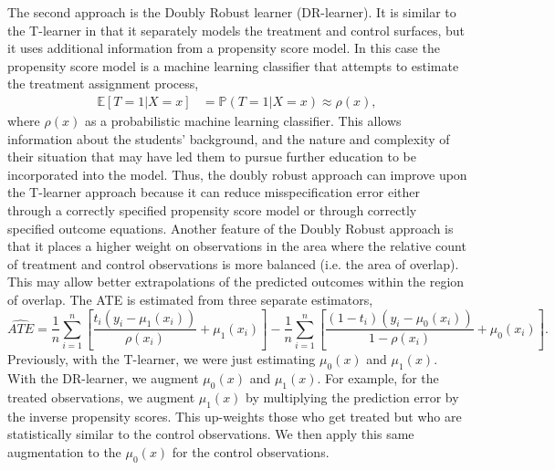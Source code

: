 \documentclass[12pt, a4paper]{article}
\begin{document}
The second approach is the Doubly Robust learner (DR-learner). It is similar to
the T-learner in that it separately models the treatment and control surfaces,
but it uses additional information from a propensity score model. In this case
the propensity score model is a machine learning classifier that attempts
to estimate the treatment assignment process,
\begin{align}
  \mathbb{E}[T=1|X=x] &= \mathbb{P}(T=1|X=x) \approx \rho(x),
\end{align}
where $\rho(x)$ as a probabilistic machine learning classifier. This allows
information about the students' background, and the nature and complexity of
their situation that may have led them to pursue further education to be
incorporated into the model. Thus, the doubly robust approach can improve upon
the T-learner approach because it can reduce misspecification error either
through a correctly specified propensity score model or through correctly
specified outcome equations. Another feature of the Doubly Robust approach is
that it places a higher weight on observations in the area where the relative
count of treatment and control observations is more balanced (i.e. the area of
overlap). This may allow better extrapolations of the predicted outcomes within
the region of overlap. The ATE is estimated from three separate estimators, 
\begin{equation}
  \hat{ATE} = \frac{1}{n} \sum_{i=1}^{n}
    \left[\frac{t_i(y_i - \mu_1(x_i))} {\rho(x_i)} + \mu_1(x_i) \right]
    - \frac{1}{n} \sum_{i=1}^{n} 
    \left[ \frac{(1-t_i)(y_i - \mu_0(x_i))}{1-\rho(x_i)} + \mu_0(x_i) \right].
\end{equation}
Previously, with the T-learner, we were just estimating $\mu_0(x)$ and
$\mu_1(x)$. With the DR-learner, we augment $\mu_0(x)$ and $\mu_1(x)$. For
example, for the treated observations, we augment $\mu_1(x)$ by multiplying the
prediction error by the inverse propensity scores. This up-weights those who
get treated but who are statistically similar to the control observations. We
then apply this same augmentation to the $\mu_0(x)$ for the control
observations. 
\end{document}
